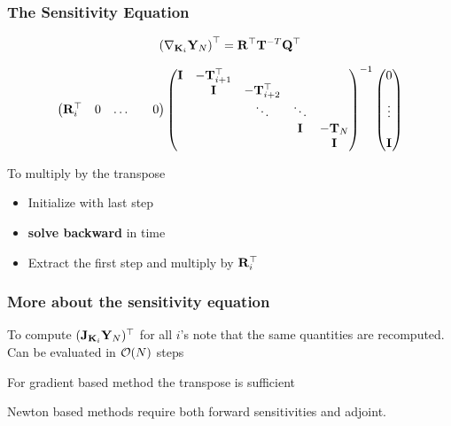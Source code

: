 \documentclass[12pt,fleqn,handout]{beamer}
\begin{document}
\begin{frame}[fragile]\frametitle{The Sensitivity Equation}

$$ \left(\nabla_{{\bf K}_i}{\bf Y}_{N}\right)^{\top} =  {\bf R}^{\top} {\bf T}^{-T} {\bf Q}^{\top} $$


{\small
\begin{eqnarray*}
\begin{pmatrix} {\bf R}_i^{\top}  &   0   &  \hdots     &   & 0 \end{pmatrix}
\begin{pmatrix}
{\bf I}              &  -{\bf T}_{i+1}^{\top}  &                &          &       \\
                    &   {\bf I}       &     -{\bf T}_{i+2}^{\top}           &          &       \\
                    &     &  \ddots    &    \ddots      &      \\
                    &     &      &    {\bf I}      &  -{\bf T}_{N}    \\
                    &     &        &          & {\bf I}
                    \end{pmatrix}^{-1}
  \begin{pmatrix} 0 \\    \\   \vdots  \\    \\  {\bf I} \end{pmatrix}
\end{eqnarray*}
}



To multiply by the transpose
\begin{itemize}
\item Initialize with last step
\item {\bf solve backward} in time
\item Extract the first step and multiply by ${\bf R}_i^{\top} $
\end{itemize}

\end{frame}

\begin{frame}[fragile]\frametitle{More about the sensitivity equation}

To compute $({{\bf J}_{{\bf K}_i}}{\bf Y}_N)^{\top} $ for all $i$'s note that the same quantities
are recomputed. Can be evaluated in ${\cal O}(N)$ steps

\bigskip

For gradient based method the transpose is sufficient

\bigskip

Newton based methods require both forward sensitivities and adjoint.


\end{frame}
\end{document}
